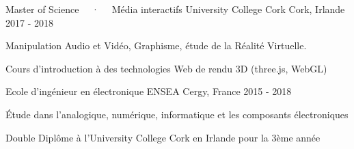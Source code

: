 

\begin{cventries}

  \cventry
    {Master of Science ~~·~~ Média interactifs} %
    {University College Cork} %
    {Cork, Irlande} %
    {2017 - 2018} %
    {
      \begin{cvitems} %
        \item {Manipulation Audio et Vidéo, Graphisme, étude de la Réalité Virtuelle.}
        \item {Cours d'introduction à des technologies Web de rendu 3D (three.js, WebGL)}
      \end{cvitems}
    }
    
 \cventry
    {Ecole d'ingénieur en électronique} 
    {ENSEA} %
    {Cergy, France} %
    {2015 - 2018} %
    {
      \begin{cvitems} %
        \item {Étude dans l’analogique, numérique, informatique et les composants électroniques}
        \item {Double Diplôme à l’University College Cork en Irlande pour la 3ème année}
      \end{cvitems}
    }
\end{cventries}
